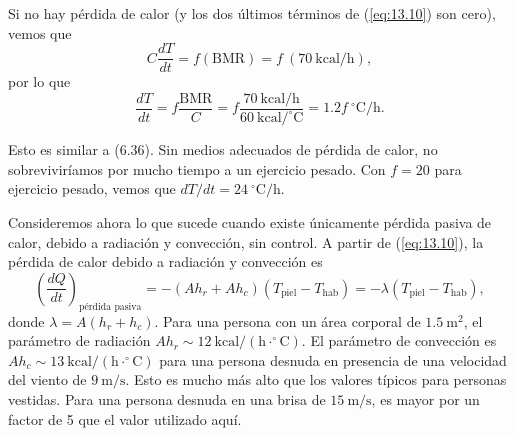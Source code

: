 \documentclass[12pt]{book}
\begin{document}
Si no hay pérdida de calor (y los dos últimos términos de (\ref{eq:13.10}) son cero), vemos que
\begin{equation}
  C \frac{dT}{dt} = f (\text{BMR}) = f\ (70\ \text{kcal/h}), \label{eq:13.13}
\end{equation}
por lo que
\begin{equation}
  \frac{dT}{dt} = f \frac{\text{BMR}}{C} = f \frac{70\ \text{kcal/h}}{60\ \text{kcal}/^\circ\text{C}} = 1.2 f\ ^\circ\text{C/h}. \label{eq:13.14}
\end{equation}

Esto es similar a (6.36). Sin medios adecuados de pérdida de calor, no sobreviviríamos por mucho tiempo a un ejercicio pesado. Con $f = 20$ para ejercicio pesado, vemos que $dT/dt = 24\ ^\circ\text{C/h}$.

Consideremos ahora lo que sucede cuando existe únicamente pérdida pasiva de calor, debido a radiación y convección, sin control. A partir de (\ref{eq:13.10}), la pérdida de calor debido a radiación y convección es
\begin{equation}
  \left( \frac{dQ}{dt} \right)_{\text{pérdida pasiva}} = -(A h_r + A h_c)(T_{\text{piel}} - T_{\text{hab}}) = -\lambda (T_{\text{piel}} - T_{\text{hab}}), \label{eq:13.15}
\end{equation}
donde $\lambda = A(h_r + h_c)$. Para una persona con un área corporal de $1.5\ \text{m}^2$, el parámetro de radiación $A h_r \sim 12\ \text{kcal}/(\text{h}\cdot^\circ\text{C})$. El parámetro de convección es $A h_c \sim 13\ \text{kcal}/(\text{h}\cdot^\circ\text{C})$ para una persona desnuda en presencia de una velocidad del viento de $9\ \text{m/s}$. Esto es mucho más alto que los valores típicos para personas vestidas. Para una persona desnuda en una brisa de $15\ \text{m/s}$, es mayor por un factor de 5 que el valor utilizado aquí.
\end{document}
